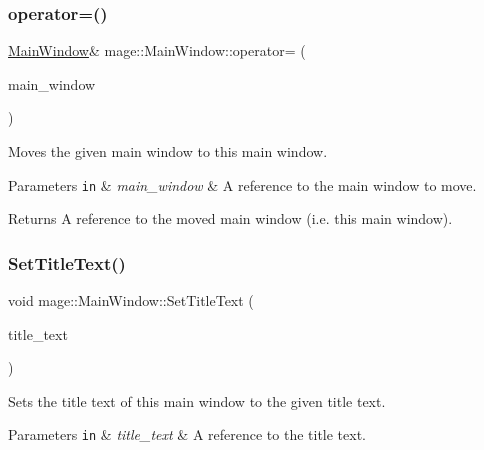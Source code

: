 \subsubsection{\texorpdfstring{operator=()}{operator=()}\hspace{0.1cm}{\footnotesize\ttfamily [2/2]}}
{\footnotesize\ttfamily \hyperlink{classmage_1_1_main_window}{Main\+Window}\& mage\+::\+Main\+Window\+::operator= (\begin{DoxyParamCaption}\item[{\hyperlink{classmage_1_1_main_window}{Main\+Window} \&\&}]{main\+\_\+window }\end{DoxyParamCaption})\hspace{0.3cm}{\ttfamily [delete]}}

Moves the given main window to this main window.


\begin{DoxyParams}[1]{Parameters}
\mbox{\tt in}  & {\em main\+\_\+window} & A reference to the main window to move. \\
\hline
\end{DoxyParams}
\begin{DoxyReturn}{Returns}
A reference to the moved main window (i.\+e. this main window). 
\end{DoxyReturn}
\hypertarget{classmage_1_1_main_window_aaadd51dc2b902d93ea2f28d685477301}{}\label{classmage_1_1_main_window_aaadd51dc2b902d93ea2f28d685477301} 
\subsubsection{\texorpdfstring{Set\+Title\+Text()}{SetTitleText()}\hspace{0.1cm}{\footnotesize\ttfamily [1/2]}}
{\footnotesize\ttfamily void mage\+::\+Main\+Window\+::\+Set\+Title\+Text (\begin{DoxyParamCaption}\item[{const wstring \&}]{title\+\_\+text }\end{DoxyParamCaption})\hspace{0.3cm}{\ttfamily [noexcept]}}

Sets the title text of this main window to the given title text.


\begin{DoxyParams}[1]{Parameters}
\mbox{\tt in}  & {\em title\+\_\+text} & A reference to the title text. \\
\hline
\end{DoxyParams}
\hypertarget{classmage_1_1_main_window_a1baa8554782be197fb5932c3af461f0e}{}\label{classmage_1_1_main_window_a1baa8554782be197fb5932c3af461f0e} 
